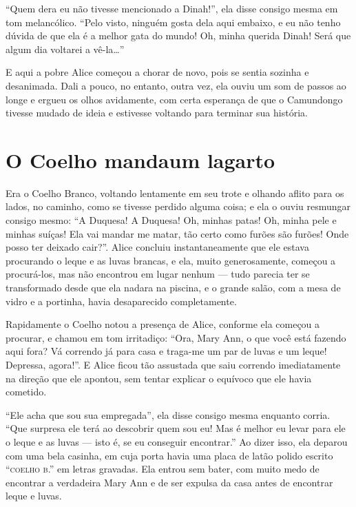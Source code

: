 ``Quem dera eu não tivesse mencionado a Dinah!'', ela disse consigo
mesma em tom melancólico. ``Pelo visto, ninguém gosta dela aqui embaixo,
e eu não tenho dúvida de que ela é a melhor gata do mundo! Oh, minha
querida Dinah! Será que algum dia voltarei a vê-la\ldots{}''

E aqui a pobre Alice começou a chorar de novo, pois se sentia sozinha e
desanimada. Dali a pouco, no entanto, outra vez, ela ouviu um som de passos
ao longe e ergueu os olhos avidamente, com certa esperança de que o
Camundongo tivesse mudado de ideia e estivesse voltando para terminar
sua história.

\quebra\chapter[O Coelho manda um lagarto]{O Coelho manda\break um lagarto}

Era o Coelho Branco, voltando lentamente em seu trote e olhando aflito
para os lados, no caminho, como se tivesse perdido alguma coisa; e ela
o ouviu resmungar consigo mesmo: ``A Duquesa! A Duquesa! Oh, minhas
patas! Oh, minha pele e minhas suíças! Ela vai mandar me matar, tão
certo como furões são furões! Onde posso ter deixado cair?''. Alice
concluiu instantaneamente que ele estava procurando o leque e as luvas
brancas, e ela, muito generosamente, começou a procurá-los, mas não
encontrou em lugar nenhum --- tudo parecia ter se transformado desde que
ela nadara na piscina, e o grande salão, com a mesa de vidro e a
portinha, havia desaparecido completamente.

Rapidamente o Coelho notou a presença de Alice, conforme ela começou a
procurar, e chamou em tom irritadiço: ``Ora, Mary Ann, o que você está
fazendo aqui fora? Vá correndo já para casa e traga-me um par de luvas
e um leque! Depressa, agora!''. E Alice ficou tão assustada que saiu
correndo imediatamente na direção que ele apontou, sem tentar explicar o
equívoco que ele havia cometido.

``Ele acha que sou sua empregada'', ela disse consigo mesma enquanto
corria. ``Que surpresa ele terá ao descobrir quem sou eu! Mas é melhor
eu levar para ele o leque e as luvas --- isto é, se eu conseguir
encontrar.'' Ao dizer isso, ela deparou com uma bela casinha, em cuja
porta havia uma placa de latão polido escrito ``\textsc{coelho b}.'' em letras
gravadas. Ela entrou sem bater, com muito medo de encontrar a verdadeira
Mary Ann e de ser expulsa da casa antes de encontrar leque e luvas.

